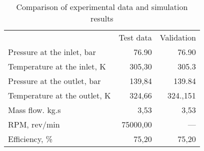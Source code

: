 \begin{table}
\label{tab:Comparison}
\caption{Comparison of experimental data and simulation results}
\begin{center}
\begin{tabulary}{0.9\textwidth}{LRR}

	&	Test data \cite{Rinaldi_2013}	&	Validation	\\
Pressure at the inlet, bar	&	76.90	&	76.90	\\
Temperature at the inlet, K	&	305,30	&	305.3	\\
Pressure at the outlet, bar	&	139,84	&	139.84	\\
Temperature at the outlet, K	&	324,66	&	324.,151	\\
Mass flow. kg.s	&	3,53	&	3,53	\\
RPM, rev/min	&	75000,00	&	—	\\
Efficiency, \%	&	75,20	&	75,20	\\

\end{tabulary}
\end{center}
\end{table}